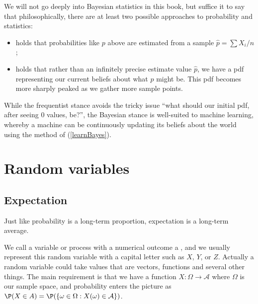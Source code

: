 We will not go deeply into Bayesian statistics in this book, but suffice it to say that philosophically, there are at least two possible approaches to probability and statistics:
\begin{itemize}
\item {} holds that probabilities like $p$ above are estimated from a sample $\hat p=\sum X_i/n$;
\item {} holds that rather than an infinitely precise estimate value $\hat p$, we have a pdf representing our current beliefs about what $p$ might be. This pdf becomes more sharply peaked as we gather more sample points.
\end{itemize}
While the frequentist stance avoids the tricky issue ``what should our initial pdf, after seeing 0 values, be?'', the Bayesian stance is well-suited to machine learning, whereby a machine can be continuously updating its beliefs about the world using the method of (\ref{learnBayes}).

\section{Random variables}
\label{randomVariablesSection}



\subsection{Expectation}


Just like probability is a long-term proportion, expectation is a long-term average.

We call a variable or process with a numerical outcome a , and we usually represent this random variable with a capital letter such as $X$, $Y$, or $Z$.
Actually a random variable could take values that are vectors, functions and several other things. The main requirement is that we have a function $X:\Omega\to \mathcal A$ where $\Omega$ is our sample space, and probability enters the picture as $\P(X\in A)=\P(\{\omega\in\Omega:X(\omega)\in\mathcal A\})$.



